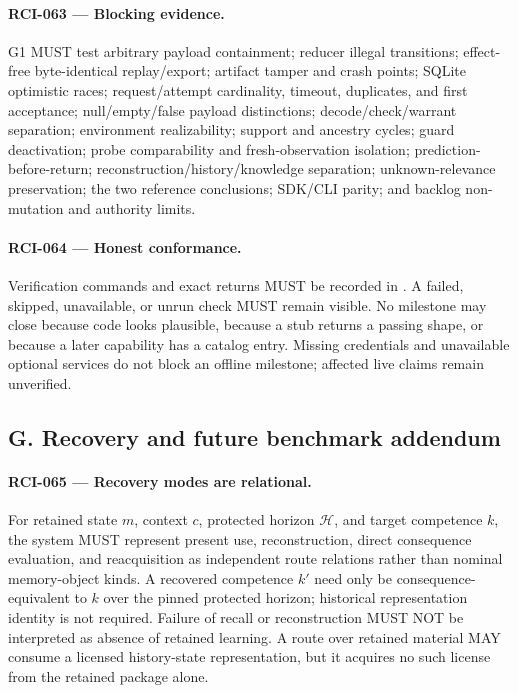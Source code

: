 \documentclass[11pt]{article}
\begin{document}
\paragraph{RCI-063 --- Blocking evidence.}
G1 MUST test arbitrary payload containment; reducer illegal transitions;
effect-free byte-identical replay/export; artifact tamper and crash points;
SQLite optimistic races; request/attempt cardinality, timeout, duplicates, and
first acceptance; null/empty/false payload distinctions; decode/check/warrant
separation; environment realizability; support and ancestry cycles; guard
deactivation; probe comparability and fresh-observation isolation;
prediction-before-return; reconstruction/history/knowledge separation;
unknown-relevance preservation; the two reference conclusions; SDK/CLI parity;
and backlog non-mutation and authority limits.

\paragraph{RCI-064 --- Honest conformance.}
Verification commands and exact returns MUST be recorded in
. A failed, skipped, unavailable, or unrun check MUST
remain visible. No milestone may close because code looks plausible, because a
stub returns a passing shape, or because a later capability has a catalog
entry. Missing credentials and unavailable optional services do not block an
offline milestone; affected live claims remain unverified.

\subsection{G. Recovery and future benchmark addendum}

\paragraph{RCI-065 --- Recovery modes are relational.}
For retained state \(m\), context \(c\), protected horizon \(\mathcal H\), and
target competence \(k\), the system MUST represent present use,
reconstruction, direct consequence evaluation, and reacquisition as independent
route relations rather than nominal memory-object kinds. A recovered competence
\(k'\) need only be consequence-equivalent to \(k\) over the pinned protected
horizon; historical representation identity is not required. Failure of recall
or reconstruction MUST NOT be interpreted as absence of retained learning. A
route over retained material MAY consume a licensed history-state
representation, but it acquires no such license from the retained package alone.
\end{document}
